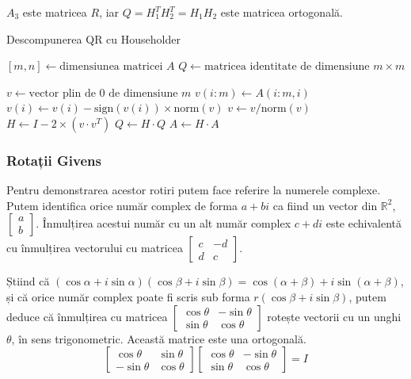 \documentclass{exam}
\begin{document}
$A_3$ este matricea $R$, iar $Q = H_1^T H_2^T = H_1 H_2$ este matricea
ortogonală.

\begin{algorithm}
	\caption{Descompunerea QR cu Householder}
	\begin{algorithmic}[1]
		\State \( [m, n] \gets \text{dimensiunea matricei } A \)
		\State \( Q \gets \text{matricea identitate de dimensiune } m \times m \)

		\State \( v \gets \text{vector plin de 0 de dimensiune } m \)
		\State \( v(i:m) \gets A(i:m, i) \)
		\State \( v(i) \gets v(i) - \text{sign}(v(i)) \times \text{norm}(v) \)
		\State \( v \gets v / \text{norm}(v) \)
		\State \( H \gets I - 2 \times (v \cdot v^T) \)
		\State \( Q \gets H \cdot Q \)
		\State \( A \gets H \cdot A \)
		\EndFor
	\end{algorithmic}
\end{algorithm}

\subsubsection{Rotații Givens}

Pentru demonstrarea acestor rotiri putem face referire la numerele
complexe. Putem identifica orice număr complex de forma $a + bi$
ca fiind un vector din $\mathbb{R}^2$, $\begin{bmatrix} a \\ b \end{bmatrix}$.
Înmulțirea acestui număr cu un alt număr complex $c + di$ este echivalentă cu
înmulțirea vectorului cu matricea $\begin{bmatrix} c & -d \\ d & c \end{bmatrix}$.

Știind că $ (\cos \alpha + i \sin \alpha)(\cos \beta + i \sin \beta) = \cos(\alpha + \beta) + i \sin(\alpha + \beta)$,
și că orice număr complex poate fi scris sub forma $r(\cos \beta + i \sin \beta)$,
putem deduce că înmulțirea cu matricea $\begin{bmatrix} \cos \theta & -\sin \theta \\ \sin \theta & \cos \theta \end{bmatrix}$
rotește vectorii cu un unghi $\theta$, în sens trigonometric. Această matrice
este una ortogonală.
\begin{equation*}
	\begin{bmatrix} \cos \theta & \sin \theta \\ -\sin \theta & \cos \theta \end{bmatrix} \begin{bmatrix} \cos \theta & -\sin \theta \\ \sin \theta & \cos \theta \end{bmatrix} = I
\end{equation*}
\end{document}
